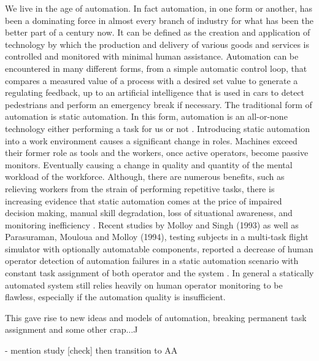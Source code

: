
We live in the age of automation. In fact automation, in one form or another, has been a dominating force in almost every branch of industry for what has been the better part of a century now. It can be defined as the creation and application of technology by which the production and delivery of various goods and services is controlled and monitored with minimal human assistance. Automation can be encountered in many different forms, from a simple automatic control loop, that compares a measured value of a process with a desired set value to generate a regulating feedback, up to an artificial intelligence that is used in cars to detect pedestrians and perform an emergency break if necessary. 
The traditional form of automation is static automation. In this form, automation is an all-or-none technology either performing a task for us or not \cite{Byrne2006}. Introducing static automation into a work environment causes a significant change in roles. Machines exceed their former role as tools and the workers, once active operators, become passive monitors. Eventually causing a change in quality and quantity of the mental workload of the workforce. 
Although, there are numerous benefits, such as relieving workers from the strain of performing repetitive tasks, there is increasing evidence that static automation comes at the price of impaired decision making, manual skill degradation, loss of situational awareness, and monitoring inefficiency \cite{Byrne2006}. 
Recent studies by Molloy and Singh (1993) as well as Parasuraman, Mouloua and Molloy (1994), testing subjects in a multi-task flight simulator with optionally automatable components, reported a decrease of human operator detection of automation failures in a static automation scenario with constant task assignment of both operator and the system \cite{Byrne2006}.
In general a statically automated system still relies heavily on human operator monitoring to be flawless, especially if the automation quality is insufficient. 


This gave rise to new ideas and models of automation, breaking permanent task assignment and some other crap...^^


- mention study [check]  then transition to AA

